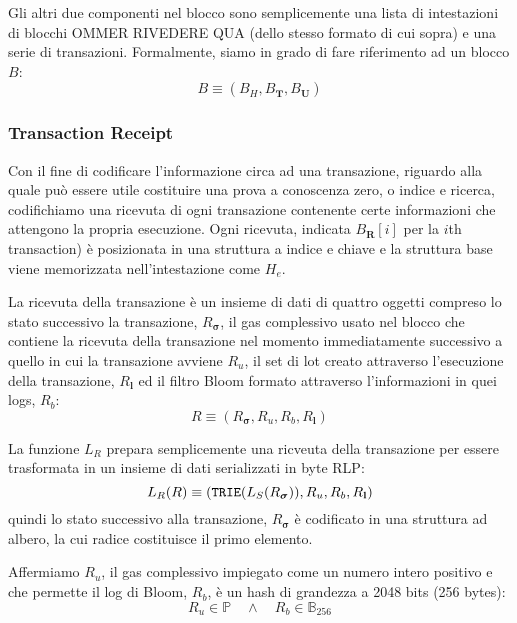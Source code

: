\documentclass[9pt,oneside]{amsart}
\begin{document}
\begin{multicols}{2}
Gli altri due componenti nel blocco sono semplicemente una lista di intestazioni di blocchi OMMER RIVEDERE QUA (dello stesso formato di cui sopra) e una serie di transazioni. Formalmente, siamo in grado di fare riferimento ad un blocco $B$:
\begin{equation}
B \equiv (B_H, B_\mathbf{T}, B_\mathbf{U})
\end{equation}

\subsubsection{Transaction Receipt}

Con il fine di codificare l'informazione circa ad una transazione, riguardo alla quale può essere utile costituire una prova a conoscenza zero, o indice e ricerca, codifichiamo una ricevuta di ogni transazione contenente certe informazioni che attengono la propria esecuzione. Ogni ricevuta, indicata $B_\mathbf{R}[i]$ per la $i$th transaction) è posizionata in una struttura a indice e chiave e la struttura base viene memorizzata nell'intestazione come $H_e$.

La ricevuta della transazione è un insieme di dati di quattro oggetti compreso lo stato successivo la transazione, $R_{\boldsymbol{\sigma}}$, il gas complessivo usato nel blocco che contiene la ricevuta della transazione nel momento immediatamente successivo a quello in cui la transazione avviene $R_u$, il set di lot creato attraverso l'esecuzione della transazione, $R_\mathbf{l}$ ed il filtro Bloom formato attraverso l'informazioni in quei logs, $R_b$:
\begin{equation}
R \equiv (R_{\boldsymbol{\sigma}}, R_u, R_b, R_\mathbf{l})
\end{equation}

La funzione $L_R$ prepara semplicemente una ricveuta della transazione per essere trasformata in un insieme di dati serializzati in byte RLP:
\begin{equation}
L_R(R) \equiv (\mathtt{\small TRIE}(L_S(R_{\boldsymbol{\sigma}})), R_u, R_b, R_\mathbf{l})
\end{equation}
quindi lo stato successivo alla transazione, $R_{\boldsymbol{\sigma}}$ è codificato in una struttura ad albero, la cui radice costituisce il primo elemento.

Affermiamo $R_u$, il gas complessivo impiegato come un numero intero positivo e che permette il log di Bloom, $R_b$, è un hash di grandezza a 2048 bits (256 bytes):
\begin{equation}
R_u \in \mathbb{P} \quad \wedge \quad R_b \in \mathbb{B}_{256}
\end{equation}


\end{multicols}
\end{document}

